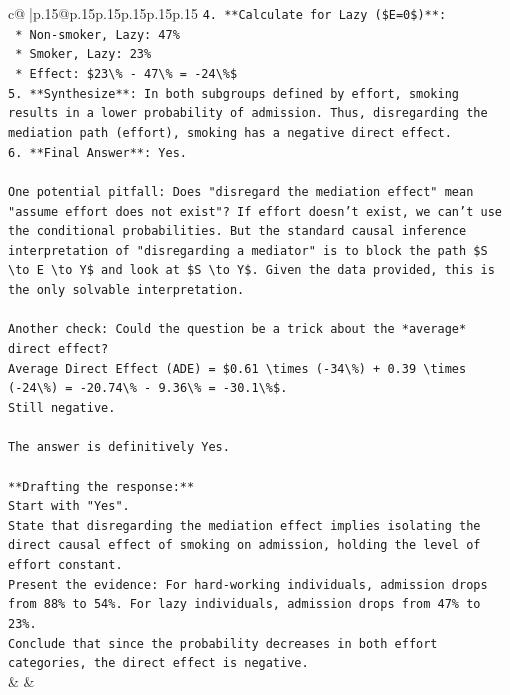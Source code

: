 \documentclass{article}
\begin{document}
{\begin{supertabular}{c@{$\;$}|p{.15\linewidth}@{}p{.15\linewidth}p{.15\linewidth}p{.15\linewidth}p{.15\linewidth}p{.15\linewidth}}
{{{\texttt{4.  **Calculate for Lazy (\$E=0\$)**:} \\
\texttt{    *   Non{-}smoker, Lazy: 47\%} \\
\texttt{    *   Smoker, Lazy: 23\%} \\
\texttt{    *   Effect: \$23\textbackslash{}\% {-} 47\textbackslash{}\% = {-}24\textbackslash{}\%\$} \\
\texttt{5.  **Synthesize**: In both subgroups defined by effort, smoking results in a lower probability of admission. Thus, disregarding the mediation path (effort), smoking has a negative direct effect.} \\
\texttt{6.  **Final Answer**: Yes.} \\
\\ 
\texttt{One potential pitfall: Does "disregard the mediation effect" mean "assume effort does not exist"? If effort doesn't exist, we can't use the conditional probabilities. But the standard causal inference interpretation of "disregarding a mediator" is to block the path \$S \textbackslash{}to E \textbackslash{}to Y\$ and look at \$S \textbackslash{}to Y\$. Given the data provided, this is the only solvable interpretation.} \\
\\ 
\texttt{Another check: Could the question be a trick about the *average* direct effect?} \\
\texttt{Average Direct Effect (ADE) = \$0.61 \textbackslash{}times ({-}34\textbackslash{}\%) + 0.39 \textbackslash{}times ({-}24\textbackslash{}\%) = {-}20.74\textbackslash{}\% {-} 9.36\textbackslash{}\% = {-}30.1\textbackslash{}\%\$.} \\
\texttt{Still negative.} \\
\\ 
\texttt{The answer is definitively Yes.} \\
\\ 
\texttt{**Drafting the response:**} \\
\texttt{Start with "Yes".} \\
\texttt{State that disregarding the mediation effect implies isolating the direct causal effect of smoking on admission, holding the level of effort constant.} \\
\texttt{Present the evidence: For hard{-}working individuals, admission drops from 88\% to 54\%. For lazy individuals, admission drops from 47\% to 23\%.} \\
\texttt{Conclude that since the probability decreases in both effort categories, the direct effect is negative.} \\
            }
        }
    }
    & & \\ \\


\end{supertabular}}
\end{document}
